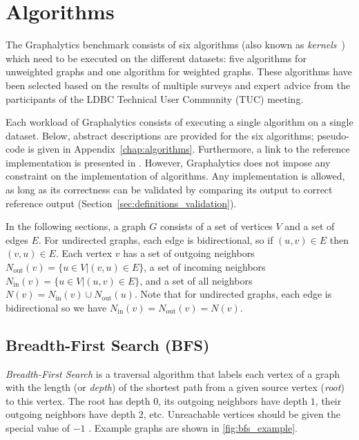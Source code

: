 \section{Algorithms}
\label{sec:definition_algorithms}

The Graphalytics benchmark consists of six algorithms (also known as \emph{kernels}~\cite{DBLP:conf/hipc/BaderM05}) which need to be executed on the different datasets: five algorithms for unweighted graphs and one algorithm for weighted graphs. These algorithms have been selected based on the results of multiple surveys and expert advice from the participants of the LDBC Technical User Community (TUC) meeting.

Each workload of Graphalytics consists of executing a single algorithm on a single dataset. Below, abstract descriptions are provided for the six algorithms; pseudo-code is given in Appendix~\ref{chap:algorithms}. Furthermore, a link to the reference implementation is presented in . However, Graphalytics does not impose any constraint on the implementation of algorithms. Any implementation is allowed, as long as its correctness can be validated by comparing its output to correct reference output (Section~\ref{sec:definitions_validation}). 

In the following sections, a graph $G$ consists of a set of vertices $V$ and a set of edges $E$. For undirected graphs, each edge is bidirectional, so if $(u,v)\in E$ then $(v,u)\in E$. Each vertex $v$ has a set of outgoing neighbors
$N_\mathrm{out}(v) = \{u \in V | (v, u) \in E \}$, a set of incoming neighbors
$N_\mathrm{in}(v)  = \{u \in V | (u, v) \in E \}$, and a set of all neighbors
$N(v) = N_\mathrm{in}(v) \cup N_\mathrm{out}(u)$.
Note that for undirected graphs, each edge is bidirectional so we have $N_\mathrm{in}(v) = N_\mathrm{out}(v) = N(v)$.


\subsection{Breadth-First Search (BFS)}
\label{sec:bfs}
\emph{Breadth-First Search} is a traversal algorithm that labels each vertex of a graph with the length (or \emph{depth}) of the shortest path from a given source vertex (\emph{root}) to this vertex. The root has depth $0$, its outgoing neighbors have depth $1$, their outgoing neighbors have depth $2$, etc. Unreachable vertices should be given the special value of $-1$ . Example graphs are shown in \autoref{fig:bfs_example}.


